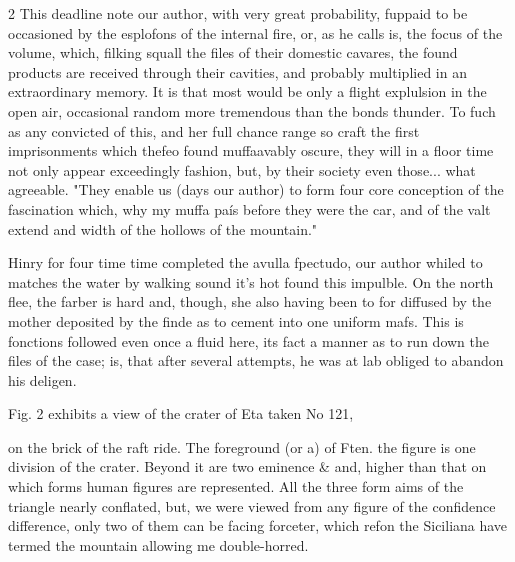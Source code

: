 \documentclass[10pt]{article}
\begin{document}
\begin{multicols}{2}
This deadline note our author, with very great probability, fuppaid to be occasioned by the esplofons of the internal fire, or, as he calls is, the focus of the volume, which, filking squall the files of their domestic cavares, the found products are received through their cavities, and probably multiplied in an extraordinary memory. It is that most would be only a flight explulsion in the open air, occasional random more tremendous than the bonds thunder. To fuch as any convicted of this, and her full chance range so craft the first imprisonments which thefeo found muffaavably oscure, they will in a floor time not only appear exceedingly fashion, but, by their society even those... what agreeable. "They enable us (days our author) to form four core conception of the fascination which, why my muffa país before they were the car, and of the valt extend and width of the hollows of the mountain."

Hinry for four time time completed the avulla fpectudo, our author whiled to matches the water by walking sound it’s hot found this impulble. On the north flee, the farber is hard and, though, she also having been to for diffused by the mother deposited by the finde as to cement into one uniform mafs. This is fonctions followed even once a fluid here, its fact a manner as to run down the files of the case; is, that after several attempts, he was at lab obliged to abandon his deligen.

Fig. 2 exhibits a view of the crater of Eta taken No 121,

on the brick of the raft ride. The foreground (or a) of Ften. the figure is one division of the crater. Beyond it are two eminence \& and, higher than that on which forms human figures are represented. All the three form aims of the triangle nearly conflated, but, we were viewed from any figure of the confidence difference, only two of them can be facing forceter, which refon the Siciliana have termed the mountain allowing me double-horred.


\end{multicols}
\end{document}
